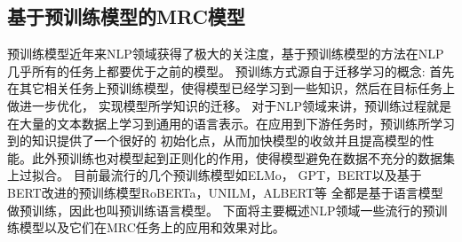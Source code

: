 \subsection{基于预训练模型的MRC模型}
预训练模型近年来NLP领域获得了极大的关注度，基于预训练模型的方法在NLP几乎所有的任务上都要优于之前的模型。
预训练方式源自于迁移学习的概念: 首先在其它相关任务上预训练模型，使得模型已经学习到一些知识，然后在目标任务上做进一步优化，
实现模型所学知识的迁移。
对于NLP领域来讲，预训练过程就是在大量的文本数据上学习到通用的语言表示。在应用到下游任务时，预训练所学习到的知识提供了一个很好的
初始化点，从而加快模型的收敛并且提高模型的性能。此外预训练也对模型起到正则化的作用，使得模型避免在数据不充分的数据集上过拟合。
目前最流行的几个预训练模型如ELMo，
GPT，BERT以及基于BERT改进的预训练模型RoBERTa，UNILM，ALBERT等
全都是基于语言模型做预训练，因此也叫预训练语言模型。
下面将主要概述NLP领域一些流行的预训练模型以及它们在MRC任务上的应用和效果对比。

